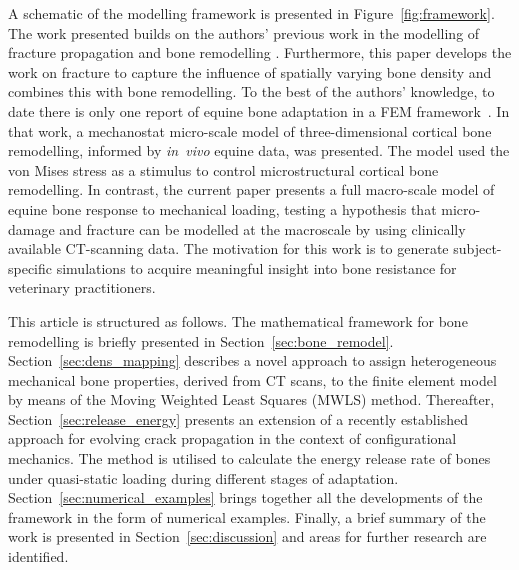\documentclass[review]{elsarticle}
\numberwithin{equation}{section}
\begin{document}
A schematic of the modelling framework is presented in Figure~\ref{fig:framework}. The work presented builds on the authors' previous work in the modelling of fracture propagation \citep{kaczmarczyk2014three,kaczmarczyk2017energy} and bone remodelling \citep{kaczmarczyk2011efficient,lewandowski2017}. Furthermore, this paper develops the work on fracture to capture the influence of spatially varying bone density and combines this with bone remodelling. 
To the best of the authors' knowledge, to date there is only one report of equine bone adaptation in a FEM framework~\citep{Wang2016}. 
In that work, a mechanostat micro-scale model of three-dimensional cortical bone remodelling, informed by \emph{in~vivo} equine data, was presented. 
The model used the von Mises stress as a stimulus to control microstructural cortical bone remodelling.
In contrast, the current paper presents a full macro-scale model of equine bone response to mechanical loading, testing a hypothesis that micro-damage and fracture can be modelled at the macroscale by using clinically available CT-scanning data.
The motivation for this work is to generate subject-specific simulations to acquire meaningful insight into bone resistance
 for veterinary practitioners.



This article is structured as follows. The mathematical framework for bone remodelling is briefly presented in Section~\ref{sec:bone_remodel}.
Section~\ref{sec:dens_mapping} describes a novel approach to assign heterogeneous mechanical bone properties, derived from CT scans,
to the finite element model by means of the Moving Weighted Least Squares (MWLS) method.
Thereafter, Section~\ref{sec:release_energy} presents an extension of a recently established approach 
for evolving crack propagation in the context of configurational mechanics. The method is utilised to calculate the energy release rate of bones under quasi-static loading during different stages of adaptation. 
Section~\ref{sec:numerical_examples} brings together all the developments of the framework in the form of numerical examples. 
Finally, a brief summary of the work is presented in Section~\ref{sec:discussion} and areas for further research are identified.
\end{document}

